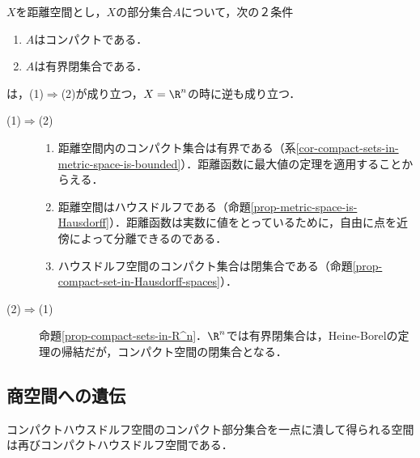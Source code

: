 \documentclass[uplatex,dvipdfmx]{jsreport}
\begin{document}
\begin{corollary}[コンパクトではない空間でのコンパクト集合]
    $X$を距離空間とし，$X$の部分集合$A$について，次の２条件
    \begin{enumerate}[(1)]
        \item $A$はコンパクトである．
        \item $A$は有界閉集合である．
    \end{enumerate}
    は，(1)$\Rightarrow$(2)が成り立つ，$X=\R^n$の時に逆も成り立つ．
\end{corollary}
\begin{Proof}\mbox{}
    \begin{description}
        \item[(1)$\Rightarrow$(2)] 
        \begin{enumerate}
            \item 距離空間内のコンパクト集合は有界である（系\ref{cor-compact-sets-in-metric-space-is-bounded}）．距離函数に最大値の定理を適用することからえる．
            \item 距離空間はハウスドルフである（命題\ref{prop-metric-space-is-Hausdorff}）．距離函数は実数に値をとっているために，自由に点を近傍によって分離できるのである．
            \item ハウスドルフ空間のコンパクト集合は閉集合である（命題\ref{prop-compact-set-in-Hausdorff-spaces}）．
        \end{enumerate}
        \item[(2)$\Rightarrow$(1)]
        命題\ref{prop-compact-sets-in-R^n}．$\R^n$では有界閉集合は，Heine-Borelの定理の帰結だが，コンパクト空間の閉集合となる．
    \end{description}
\end{Proof}

\subsection{商空間への遺伝}

\begin{tcolorbox}[colframe=ForestGreen, colback=ForestGreen!10!white,breakable,colbacktitle=ForestGreen!40!white,coltitle=black,fonttitle=\bfseries\sffamily,
title=]
    コンパクトハウスドルフ空間のコンパクト部分集合を一点に潰して得られる空間は再びコンパクトハウスドルフ空間である．
\end{tcolorbox}
\end{document}
